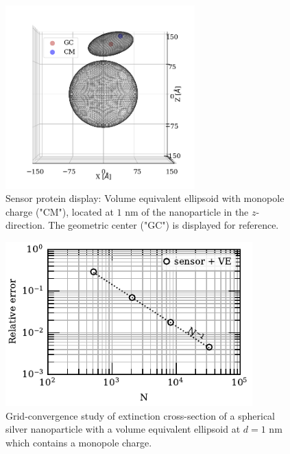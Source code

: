 \begin{figure}%
    \centering
    \includegraphics[width=0.65\textwidth]{viz/one_ve_cm_gc_display.png} 
    \caption{Sensor protein display: Volume equivalent ellipsoid with monopole charge ("CM"), located at $1$ nm of the 
    nanoparticle in the $z$-direction. The geometric center ("GC") is displayed for reference.}
    \label{fig:one_ve_sketch}
 \end{figure}


\begin{figure}%
    \centering
    \includegraphics[width=0.85\textwidth]{convergence_sensor_ve_w380.pdf} 
    \caption{Grid-convergence study of extinction cross-section of a spherical silver
             nanoparticle with a volume equivalent ellipsoid at $d=1$ nm which contains 
             a monopole charge.}
    \label{fig:err_sph-ve}
 \end{figure}

